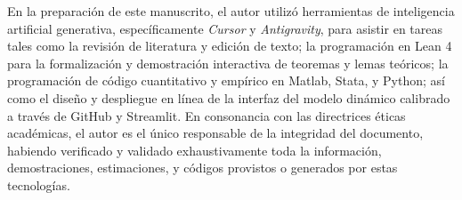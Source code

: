 \documentclass[review,authoryear,12pt]{elsarticle}
\theoremstyle{plain}
\theoremstyle{definition}
\newcommand{\1}{\mathbf{1}}
\begin{document}
En la preparación de este manuscrito, el autor utilizó herramientas de inteligencia artificial generativa, específicamente \emph{Cursor} y \emph{Antigravity}, para asistir en tareas tales como la revisión de literatura y edición de texto; la programación en Lean 4 para la formalización y demostración interactiva de teoremas y lemas teóricos; la programación de código cuantitativo y empírico en Matlab, Stata, y Python; así como el diseño y despliegue en línea de la interfaz del modelo dinámico calibrado a través de GitHub y Streamlit. En consonancia con las directrices éticas académicas, el autor es el único responsable de la integridad del documento, habiendo verificado y validado exhaustivamente toda la información, demostraciones, estimaciones, y códigos provistos o generados por estas tecnologías.




\end{document}
